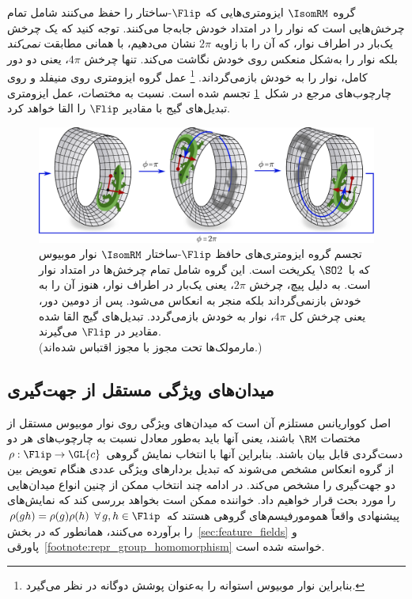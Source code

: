 گروه $\IsomRM$ ایزومتری‌هایی که $\Flip$-ساختار را حفظ می‌کنند شامل تمام چرخش‌هایی است که نوار را در امتداد خودش جابه‌جا می‌کنند.
توجه کنید که یک چرخش یک‌بار در اطراف نوار، که آن را با زاویه $2\pi$ نشان می‌دهیم، با همانی مطابقت \emph{نمی‌کند} بلکه نوار را به‌شکل منعکس روی خودش نگاشت می‌کند.
تنها چرخش $4\pi$، یعنی دو دور کامل، نوار را به خودش بازمی‌گرداند.%
\footnote{
	بنابراین نوار موبیوس استوانه را به‌عنوان پوشش دوگانه در نظر می‌گیرد.
}
عمل گروه ایزومتری روی منیفلد و روی چارچوب‌های مرجع در شکل~\ref{fig:mobius_conv_isometries} تجسم شده است.
نسبت به مختصات، عمل ایزومتری تبدیل‌های گیج با مقادیر $\Flip$ را القا خواهد کرد.

\begin{figure}
	\centering
	\includegraphics[width=\columnwidth]{figures/mobius_conv_isom.pdf}
	\caption{\small
		تجسم گروه ایزومتری‌های حافظ $\Flip$-ساختار $\IsomRM$ نوار موبیوس که با~$\SO2$ یکریخت است.
		این گروه شامل تمام چرخش‌ها در امتداد نوار است.
		به دلیل پیچ، چرخش $2\pi$، یعنی یک‌بار در اطراف نوار، هنوز آن را به خودش بازنمی‌گرداند بلکه منجر به انعکاس می‌شود.
		پس از دومین دور، یعنی چرخش کل $4\pi$، نوار به خودش بازمی‌گردد.
		تبدیل‌های گیج القا شده مقادیر در $\Flip$ می‌گیرند.
		{
			\\ \color{gray} \scriptsize
			(مارمولک‌ها تحت مجوز 
			\href{https://github.com/twitter/twemoji/blob/gh-pages/LICENSE-GRAPHICS}{\underline{}}
			با مجوز  اقتباس شده‌اند.)
		}
	}
	\label{fig:mobius_conv_isometries}
\end{figure}






\subsection{میدان‌های ویژگی مستقل از جهت‌گیری}
\label{sec:mobius_representations}

اصل کوواریانس مستلزم آن است که میدان‌های ویژگی روی نوار موبیوس مستقل از مختصات $\RM$ باشند، یعنی آنها باید به‌طور معادل نسبت به چارچوب‌های هر دو دست‌گردی قابل بیان باشند.
بنابراین آنها با انتخاب نمایش گروهی $\rho: \Flip \to \GL{c}$ از گروه انعکاس مشخص می‌شوند که تبدیل بردارهای ویژگی عددی هنگام تعویض بین دو جهت‌گیری را مشخص می‌کند.
در ادامه چند انتخاب ممکن از چنین انواع میدان‌هایی را مورد بحث قرار خواهیم داد.
خواننده ممکن است بخواهد بررسی کند که نمایش‌های پیشنهادی واقعاً همومورفیسم‌های گروهی هستند که $\rho(gh) = \rho(g)\rho(h)\,\ \forall\, g,h\in \Flip$ را برآورده می‌کنند، همانطور که در بخش~\ref{sec:feature_fields} و پاورقی~\ref{footnote:repr_group_homomorphism} خواسته شده است.

